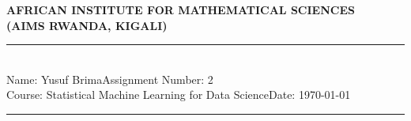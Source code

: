 \documentclass[12pt,a4paper]{article}
\newcommand{\student}{Yusuf Brima}
\newcommand{\course}{Statistical Machine Learning for Data Science}
\newcommand{\assignment}{2}
\begin{document}
\thispagestyle{empty}
\begin{center}
\textbf{AFRICAN INSTITUTE FOR MATHEMATICAL SCIENCES \\[0.5cm]
(AIMS RWANDA, KIGALI)}
\vspace{1.0cm}
\end{center}

\noindent
\rule{17cm}{0.2cm}\\[0.3cm]
Name: \student \hfill Assignment Number: \assignment\\[0.1cm]
Course: \course \hfill Date: \today\\
\rule{17cm}{0.05cm}
\vspace{1.0cm}
\end{document}
